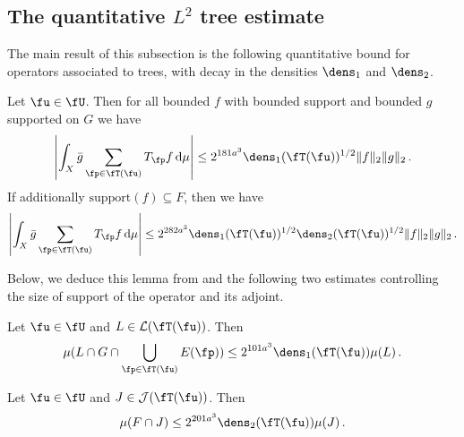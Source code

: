 \subsection{The quantitative \texorpdfstring{$L^2$}{L2} tree estimate}

The main result of this subsection is the following quantitative bound for operators associated to trees, with decay in the densities $\dens_1$ and $\dens_2$.

\begin{lemma}
    \label{densities-tree-bound}
    \leanok
    Let $\fu \in \fU$. Then for all bounded $f$ with bounded support and bounded $g$ supported on $G$ we have
    \begin{equation}
        \label{eq-cor-tree-est}
        \left|\int_X \bar g \sum_{\fp \in \fT(\fu)} T_{\fp }f \, \mathrm{d}\mu \right| \le 2^{181a^3} \dens_1(\fT(\fu))^{1/2} \|f\|_2\|g\|_2\,.
    \end{equation}
    If additionally $\text{support}(f) \subseteq F$, then we have
    \begin{equation}
        \label{eq-cor-tree-est-F}
        \left| \int_X \bar g \sum_{\fp \in \fT(\fu)} T_{\fp }f\, \mathrm{d}\mu \right| \le 2^{282a^3} \dens_1(\fT(\fu))^{1/2} \dens_2(\fT(\fu))^{1/2} \|f\|_2\|g\|_2\,.
    \end{equation}
\end{lemma}

Below, we deduce this lemma from  and the following two estimates controlling the size of support of the operator and its adjoint.

\begin{lemma}
    \label{local-dens1-tree-bound}
    \leanok
    Let $\fu \in \fU$ and $L \in \mathcal{L}(\fT(\fu))$. Then
    \begin{equation}
    \label{eq-1density-estimate-tree}
        \mu(L \cap G \cap \bigcup_{\fp \in \fT(\fu)} E(\fp)) \le 2^{101a^3} \dens_1(\fT(\fu)) \mu(L)\,.
    \end{equation}
\end{lemma}

\begin{lemma}
    \label{local-dens2-tree-bound}
    \leanok
    Let $\fu \in \fU$ and $J \in \mathcal{J}(\fT(\fu))$. Then
    $$
        \mu(F \cap J) \le 2^{201a^3} \dens_2(\fT(\fu)) \mu(J)\,.
    $$
\end{lemma}

